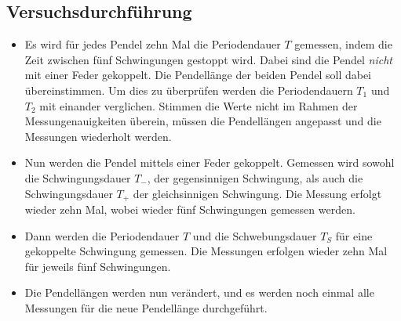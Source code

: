 \subsection{Versuchsdurchführung}
\begin{itemize}
    \item Es wird für jedes Pendel zehn Mal die Periodendauer $T$ gemessen, indem die Zeit zwischen fünf Schwingungen gestoppt wird. Dabei sind die Pendel 
        \textit{nicht} mit einer Feder gekoppelt. Die Pendellänge der beiden Pendel soll dabei übereinstimmen. Um dies zu überprüfen werden die Periodendauern 
        $T_1$ und $T_2$ mit einander verglichen. Stimmen die Werte nicht im Rahmen der Messungenauigkeiten überein, müssen die Pendellängen angepasst und die 
        Messungen wiederholt werden. 
    \item Nun werden die Pendel mittels einer Feder gekoppelt. Gemessen wird sowohl die Schwingungsdauer $T_-$, der gegensinnigen Schwingung, als auch die 
        Schwingungsdauer $T_+$ der gleichsinnigen Schwingung. Die Messung erfolgt wieder zehn Mal, wobei wieder fünf Schwingungen gemessen werden. 
    \item Dann werden die Periodendauer $T$ und die Schwebungsdauer $T_S$ für eine gekoppelte Schwingung gemessen. Die Messungen erfolgen wieder zehn Mal für 
        jeweils fünf Schwingungen.
    \item Die Pendellängen werden nun verändert, und es werden noch einmal alle Messungen für die neue Pendellänge durchgeführt.
\end{itemize}
